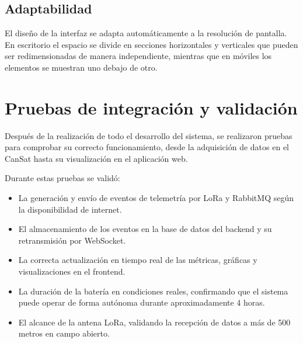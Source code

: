 \subsection{Adaptabilidad}

El diseño de la interfaz se adapta automáticamente a la resolución de pantalla.
En escritorio el espacio se divide en secciones horizontales y verticales que pueden ser redimensionadas de manera independiente, mientras que en móviles los elementos se muestran uno debajo de otro.


\section{Pruebas de integración y validación}

Después de la realización de todo el desarrollo del sistema, se realizaron pruebas para comprobar su correcto funcionamiento, desde la adquisición de datos en el CanSat hasta su visualización en el aplicación web.

Durante estas pruebas se validó:
\begin{itemize}
    \item La generación y envío de eventos de telemetría por LoRa y RabbitMQ según la disponibilidad de internet.
    \item El almacenamiento de los eventos en la base de datos del backend y su retransmisión por WebSocket.
    \item La correcta actualización en tiempo real de las métricas, gráficas y visualizaciones en el frontend.
    \item La duración de la batería en condiciones reales, confirmando que el sistema puede operar de forma autónoma durante aproximadamente 4 horas.
    \item El alcance de la antena LoRa, validando la recepción de datos a más de 500 metros en campo abierto.
\end{itemize}
